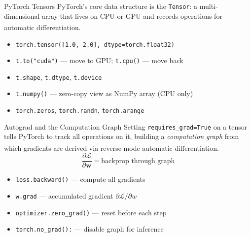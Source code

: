\begin{v3topic}{PyTorch Tensors}
    PyTorch's core data structure is the \texttt{Tensor}: a multi-dimensional array that lives on CPU or GPU and records operations for automatic differentiation\textsuperscript{\cite{raschkaPythonMachineLearning2015}}.
\visualseparator
    \begin{itemize}
        \item \texttt{torch.tensor([1.0, 2.0], dtype=torch.float32)}
        \item \texttt{t.to("cuda")} --- move to GPU; \texttt{t.cpu()} --- move back
        \item \texttt{t.shape}, \texttt{t.dtype}, \texttt{t.device}
        \item \texttt{t.numpy()} --- zero-copy view as NumPy array (CPU only)
        \item \texttt{torch.zeros}, \texttt{torch.randn}, \texttt{torch.arange}
    \end{itemize}

\end{v3topic}
\begin{v3topic}{Autograd and the Computation Graph}
    Setting \texttt{requires\_grad=True} on a tensor tells PyTorch to track all operations on it, building a \emph{computation graph} from which gradients are derived via reverse-mode automatic differentiation\textsuperscript{\cite{raschkaPythonMachineLearning2015}}.
\visualseparator
    \begin{equation}
        \frac{\partial \mathcal{L}}{\partial \mathbf{w}} = \text{backprop through graph}
    \end{equation}
    \begin{itemize}
        \item \texttt{loss.backward()} --- compute all gradients
        \item \texttt{w.grad} --- accumulated gradient $\partial\mathcal{L}/\partial w$
        \item \texttt{optimizer.zero\_grad()} --- reset before each step
        \item \texttt{torch.no\_grad():} --- disable graph for inference
    \end{itemize}

\end{v3topic}
